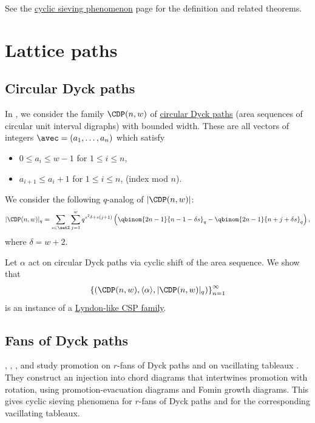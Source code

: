 
See the \hyperref[cyclicSieving]{cyclic sieving phenomenon} 
page for the definition and related theorems.



\section[cspPath]{Lattice paths}


\subsection[cspAreaSequences]{Circular Dyck paths}

In \cite{AlexanderssonLinussonPotka2019}, we consider the family $\CDP(n,w)$ of \hyperref[chromaticQuasisymmetricUnitIntervalGraph]{circular Dyck paths}
(area sequences of circular unit interval digraphs) with bounded width. 
These are all vectors of integers $\avec=(a_1,\dotsc,a_n)$ which satisfy
\begin{itemize}
\item  $0 \leq a_i \leq w-1 $ for $1 \leq i \leq n$, 
\item $a_{i+1} \leq a_{i} + 1$ for $1 \leq i \leq n$, (index mod $n$).
\end{itemize}

We consider the following $q$-analog of $|\CDP(n,w)|$:
\begin{align}
|\CDP(n,w)|_q =
\sum_{s \in \setZ}
\sum_{j=1}^w
q^{s^2\delta + s(j+1)}
\left(
\qbinom{2n-1}{n-1-\delta s}_q
-
\qbinom{2n-1}{n+j+\delta s}_q
\right),
\end{align}
where $\delta = w+2$.

Let $\alpha$ act on circular Dyck paths via cyclic shift of the area sequence.
We show that 
\[
\left\{ \left( \CDP(n,w), \langle \alpha \rangle, |\CDP(n,w)|_q \right) \right\}_{n=1}^{\infty}
\]
is an instance of a \hyperref[lyndonCSP]{Lyndon-like CSP family}.


\subsection[cspFansOfDyckPaths]{Fans of Dyck paths}

, , , and
 study promotion on $r$-fans of
Dyck paths and on vacillating tableaux \cite{PappePfannererSchillingSimone2024}.
They construct an injection into chord diagrams that intertwines promotion with
rotation, using promotion-evacuation diagrams and Fomin growth diagrams.  This
gives cyclic sieving phenomena for $r$-fans of Dyck paths and for the
corresponding vacillating tableaux.



